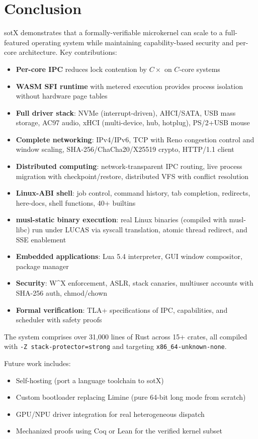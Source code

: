 \documentclass[11pt,letterpaper]{article}
\theoremstyle{definition}
\begin{document}
\section{Conclusion}

sotX demonstrates that a formally-verifiable microkernel can scale to a
full-featured operating system while maintaining capability-based security and
per-core architecture. Key contributions:

\begin{itemize}[nosep]
    \item \textbf{Per-core IPC} reduces lock contention by $C\times$ on $C$-core systems
    \item \textbf{WASM SFI runtime} with metered execution provides process isolation without hardware page tables
    \item \textbf{Full driver stack}: NVMe (interrupt-driven), AHCI/SATA, USB mass storage, AC97 audio, xHCI (multi-device, hub, hotplug), PS/2+USB mouse
    \item \textbf{Complete networking}: IPv4/IPv6, TCP with Reno congestion control and window scaling, SHA-256/ChaCha20/X25519 crypto, HTTP/1.1 client
    \item \textbf{Distributed computing}: network-transparent IPC routing, live process migration with checkpoint/restore, distributed VFS with conflict resolution
    \item \textbf{Linux-ABI shell}: job control, command history, tab completion, redirects, here-docs, shell functions, 40+ builtins
    \item \textbf{musl-static binary execution}: real Linux binaries (compiled with musl-libc) run under LUCAS via syscall translation, atomic thread redirect, and SSE enablement
    \item \textbf{Embedded applications}: Lua 5.4 interpreter, GUI window compositor, package manager
    \item \textbf{Security}: W\^{}X enforcement, ASLR, stack canaries, multiuser accounts with SHA-256 auth, chmod/chown
    \item \textbf{Formal verification}: TLA+ specifications of IPC, capabilities, and scheduler with safety proofs
\end{itemize}

The system comprises over 31,000 lines of Rust across 15+ crates, all compiled with
\texttt{-Z stack-protector=strong} and targeting \texttt{x86\_64-unknown-none}.

Future work includes:
\begin{itemize}[nosep]
    \item Self-hosting (port a language toolchain to sotX)
    \item Custom bootloader replacing Limine (pure 64-bit long mode from scratch)
    \item GPU/NPU driver integration for real heterogeneous dispatch
    \item Mechanized proofs using Coq or Lean for the verified kernel subset
\end{itemize}
\end{document}
